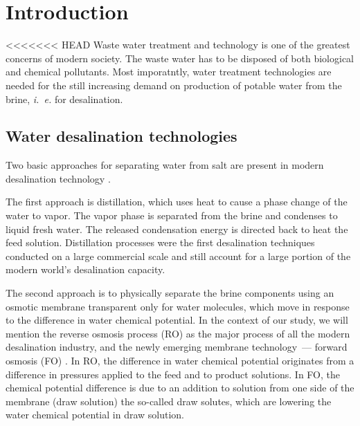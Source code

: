 \documentclass[journal,article,submit,pdftex,moreauthors]{Definitions/mdpi}
\newcommand{\ie}{\textit{i.~e.} }
\begin{document}




\section{Introduction\label{sec: intro}}

<<<<<<< HEAD
Waste water treatment and technology is one of the greatest concerns of modern society. 
The waste water has to be disposed of both biological \cite{guesmi2022} and chemical \cite{baaloudj2022_1,shahzad2022} pollutants.
Most imporatntly, water treatment technologies are needed for the still increasing demand on production of potable water from the brine, \ie for desalination.

\subsection{Water desalination technologies}
Two basic approaches for separating water from salt are present in modern desalination technology \cite{Miller2003,Curto2021}.

The first approach is distillation, which uses heat to cause a phase change of the water to vapor. 
The vapor phase is separated from the brine and condenses to liquid fresh water. 
The released condensation energy is directed back to heat the feed solution.
Distillation processes were the first desalination techniques conducted on a large commercial scale and still account for a large portion of the modern world’s desalination capacity.

The second approach is to physically separate the brine components using an osmotic membrane transparent only for water molecules, which move in response to the difference in water chemical potential.
In the context of our study, we will mention the reverse osmosis process (RO) as the major process of all the modern desalination industry, and the newly emerging membrane technology~--- forward osmosis (FO) \cite{Akther2015}. 
In RO, the difference in water chemical potential originates from a difference in pressures applied to the feed and to product solutions. 
In FO, the chemical potential difference is due to an addition to solution from one side of the membrane (draw solution) the so-called draw solutes, which are lowering the water chemical potential in draw solution.
\end{document}
